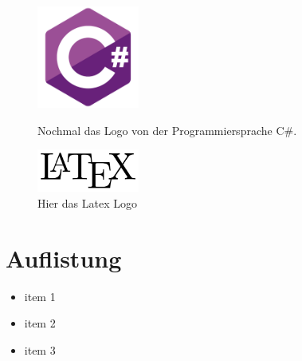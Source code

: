 \begin{figure}[h]
    \centering
    \begin{minipage}[b]{0.4\textwidth}
      \centering
      \includegraphics[width=0.3\textwidth]{chapters/00/images/Csharp.png}
      \caption{Nochmal das Logo von der Programmiersprache C\#.}
      \label{temp2}
    \end{minipage}
    \hfill
    \begin{minipage}[b]{0.4\textwidth}
        \centering
        \includegraphics[width=0.3\textwidth]{chapters/00/images/latex.png}
        \caption{Hier das Latex Logo}
        \label{temp3}
    \end{minipage}
    \label{}
\end{figure}

\section{Auflistung}

\begin{itemize}
    \item item 1 
    \item item 2 
    \item item 3
\end{itemize}